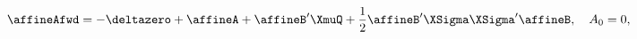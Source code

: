 \begin{equation} \label{eq:nAffineA}
	\affineAfwd = - \deltazero + \affineA + \affineB' \XmuQ + \frac{1}{2} \affineB' \XSigma \XSigma' \affineB , \quad A_{0} = 0 ,
\end{equation}